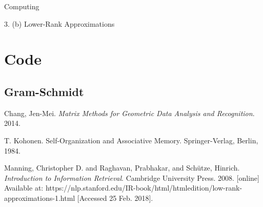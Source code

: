 \begin{section}{Computing}
\begin{homeworkSection}{3. (b) Lower-Rank Approximations}
\end{homeworkSection}

\end{section}


\newpage

\appendix

\section{Code}

\subsection{Gram-Schmidt} \label{code:gram_schmidt}




\begin{thebibliography}{10}
    Chang, Jen-Mei. \textit{Matrix Methods for Geometric Data Analysis and Recognition}. 2014.

    T. Kohonen. Self-Organization and Associative Memory. Springer-Verlag, Berlin, 1984.

    Manning, Christopher D. and Raghavan, Prabhakar, and Schütze, Hinrich.
    \textit{Introduction to Information Retrieval}. Cambridge University Press. 2008. 
    [online] Available at: https://nlp.stanford.edu/IR-book/html/htmledition/low-rank-approximations-1.html [Accessed 25 Feb. 2018].

\end{thebibliography}


